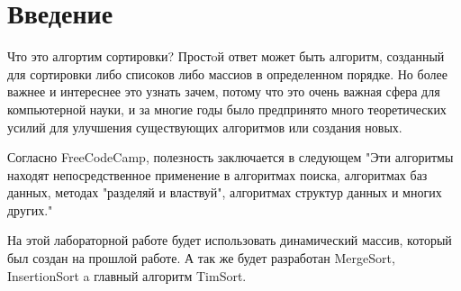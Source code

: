 
\section{Введение}


Что это алгортим сортировки? Простoй ответ может быть алгоритм,
созданный для сортировки либо списоков либо массиов в определенном порядке. Но
более важнее и интереснее это узнать зачем, потому что это очень важная
сфера для компьютерной науки, и за многие годы было предпринято много
теоретических усилий для улучшения существующих алгоритмов или создания новых.

Согласно FreeCodeCamp, полезность заключается в следующем "Эти алгоритмы
находят непосредственное применение в алгоритмах поиска, алгоритмах
баз данных, методах "разделяй и властвуй", алгоритмах структур
данных и многих других."\cite{freecodecamp}

На этой лабораторной работе будет использовать динамический массив, который
был создан на прошлой работе. А так же будет разработан MergeSort,
InsertionSort a главный алгоритм TimSort.   
